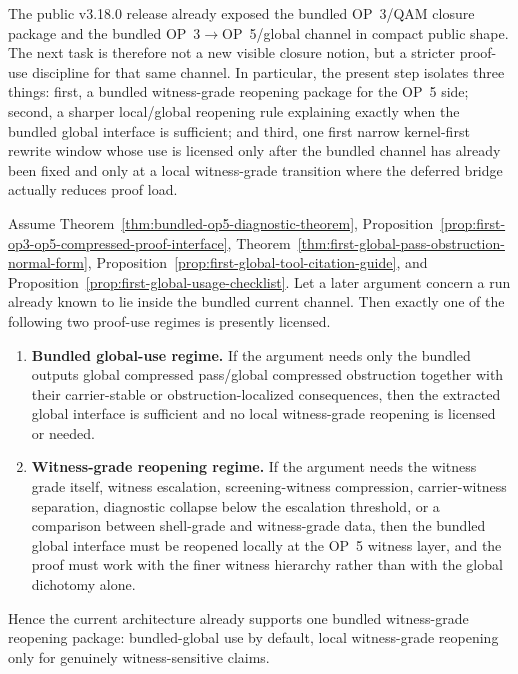 \begin{remark}
The public v3.18.0 release already exposed the bundled OP~3/QAM closure package and the bundled OP~3$\to$OP~5/global channel in compact public shape. The next task is therefore not a new visible closure notion, but a stricter proof-use discipline for that same channel. In particular, the present step isolates three things: first, a bundled witness-grade reopening package for the OP~5 side; second, a sharper local/global reopening rule explaining exactly when the bundled global interface is sufficient; and third, one first narrow kernel-first rewrite window whose use is licensed only after the bundled channel has already been fixed and only at a local witness-grade transition where the deferred bridge actually reduces proof load.
\end{remark}

\begin{theorem}
\label{thm:bundled-witness-grade-reopening-package}
Assume Theorem~\ref{thm:bundled-op5-diagnostic-theorem}, Proposition~\ref{prop:first-op3-op5-compressed-proof-interface}, Theorem~\ref{thm:first-global-pass-obstruction-normal-form}, Proposition~\ref{prop:first-global-tool-citation-guide}, and Proposition~\ref{prop:first-global-usage-checklist}. Let a later argument concern a run already known to lie inside the bundled current channel. Then exactly one of the following two proof-use regimes is presently licensed.
\begin{enumerate}[leftmargin=2em,label=(\roman*)]
\item \textbf{Bundled global-use regime.} If the argument needs only the bundled outputs global compressed pass/global compressed obstruction together with their carrier-stable or obstruction-localized consequences, then the extracted global interface is sufficient and no local witness-grade reopening is licensed or needed.
\item \textbf{Witness-grade reopening regime.} If the argument needs the witness grade itself, witness escalation, screening-witness compression, carrier-witness separation, diagnostic collapse below the escalation threshold, or a comparison between shell-grade and witness-grade data, then the bundled global interface must be reopened locally at the OP~5 witness layer, and the proof must work with the finer witness hierarchy rather than with the global dichotomy alone.
\end{enumerate}
Hence the current architecture already supports one bundled witness-grade reopening package: bundled-global use by default, local witness-grade reopening only for genuinely witness-sensitive claims.
\end{theorem}

